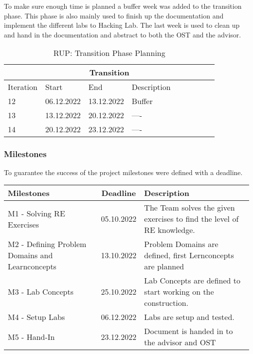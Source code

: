\noindent To make sure enough time is planned a buffer week was added to the transition phase. This phase is also mainly used to finish up the documentation and implement the different labs to Hacking Lab. The last week is used to clean up and hand in the documentation and abstract to both the OST and the advisor.
\begin{table}[H]
    \centering
    \begin{tabular}{|p{0.1\linewidth}|p{0.15\linewidth}|p{0.15\linewidth}|p{0.46\linewidth}|}
        \hline
        \multicolumn{4}{||c||}{\textbf{Transition}} \\
        \hline \hline
        Iteration & Start & End & Description \\
        \hline \hline
        12 & 06.12.2022 & 13.12.2022 & Buffer \\
        \hline
        13 & 13.12.2022 & 20.12.2022 & ---- \\
        \hline
        14 & 20.12.2022 & 23.12.2022 & ---- \\
        \hline
    \end{tabular}
    \caption{RUP: Transition Phase Planning}
    \label{transition_table}
\end{table}

\subsubsection*{Milestones}
To guarantee the success of the project milestones were defined with a deadline.

\begin{table}[H]
    \centering
    \begin{tabular}[]{|| p{5cm} | c | p{6.2cm} ||}
        \hline
        Milestones & Deadline & Description \\
        \hline \hline
        M1 - Solving RE Exercises & 05.10.2022 & The Team solves the given exercises to find the level of RE knowledge. \\
        \hline
        M2 - Defining Problem Domains and Learnconcepts& 13.10.2022 & Problem Domains are defined, first Lernconcepts are planned \\
        \hline
        M3 - Lab Concepts & 25.10.2022 & Lab Concepts are defined to start working on the construction. \\
        \hline
        M4 - Setup Labs & 06.12.2022 & Labs are setup and tested. \\
        \hline
        M5 - Hand-In & 23.12.2022 & Document is handed in to the advisor and OST \\
        \hline
    \end{tabular}
\end{table}

